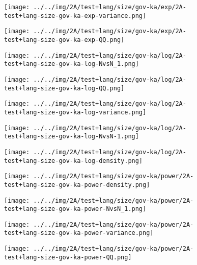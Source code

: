 \begin{figure}[H]
\centering	\texttt{[image: ../../img/2A/test+lang/size/gov-ka/exp/2A-test+lang-size-gov-ka-exp-variance.png]}
\end{figure}
\begin{figure}[H]
\centering	\texttt{[image: ../../img/2A/test+lang/size/gov-ka/exp/2A-test+lang-size-gov-ka-exp-QQ.png]}
\end{figure}
\begin{figure}[H]
\centering	\texttt{[image: ../../img/2A/test+lang/size/gov-ka/log/2A-test+lang-size-gov-ka-log-NvsN\_1.png]}
\end{figure}
\begin{figure}[H]
\centering	\texttt{[image: ../../img/2A/test+lang/size/gov-ka/log/2A-test+lang-size-gov-ka-log-QQ.png]}
\end{figure}
\begin{figure}[H]
\centering	\texttt{[image: ../../img/2A/test+lang/size/gov-ka/log/2A-test+lang-size-gov-ka-log-variance.png]}
\end{figure}
\begin{figure}[H]
\centering	\texttt{[image: ../../img/2A/test+lang/size/gov-ka/log/2A-test+lang-size-gov-ka-log-NvsN-1.png]}
\end{figure}
\begin{figure}[H]
\centering	\texttt{[image: ../../img/2A/test+lang/size/gov-ka/log/2A-test+lang-size-gov-ka-log-density.png]}
\end{figure}
\begin{figure}[H]
\centering	\texttt{[image: ../../img/2A/test+lang/size/gov-ka/power/2A-test+lang-size-gov-ka-power-density.png]}
\end{figure}
\begin{figure}[H]
\centering	\texttt{[image: ../../img/2A/test+lang/size/gov-ka/power/2A-test+lang-size-gov-ka-power-NvsN\_1.png]}
\end{figure}
\begin{figure}[H]
\centering	\texttt{[image: ../../img/2A/test+lang/size/gov-ka/power/2A-test+lang-size-gov-ka-power-variance.png]}
\end{figure}
\begin{figure}[H]
\centering	\texttt{[image: ../../img/2A/test+lang/size/gov-ka/power/2A-test+lang-size-gov-ka-power-QQ.png]}
\end{figure}
